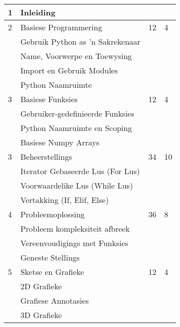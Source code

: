 \begin{longtable}{|p{2.0cm}|p{7.6cm}|p{2.0cm}|p{1.8cm}|}
             1  & Inleiding                                    &    &    \\
             \hline
             2  & Basiese Programmering                        & 12 & 4  \\
                & \qquad Gebruik Python as 'n Sakrekenaar      &    &    \\
                & \qquad Name, Voorwerpe en Toewysing          &    &    \\
                & \qquad Import en Gebruik Modules             &    &    \\
                & \qquad Python Naamruimte                     &    &    \\
             \hline
             3  & Basiese Funksies                             & 12 & 4  \\
                & \qquad Gebruiker-gedefinieerde Funksies      &    &    \\
                & \qquad Python Naamruimte en Scoping          &    &    \\
                & \qquad Basiese Numpy Arrays                  &    &    \\
             \hline
             3  & Beheerstellings                              & 34 & 10 \\
                & \qquad Iterator Gebaseerde Lus (For Lus)     &    &    \\
                & \qquad Voorwaardelike Lus (While Lus)        &    &    \\
                & \qquad Vertakking (If, Elif, Else)           &    &    \\
             \hline
             4  & Probleemoplossing                            & 36 & 8  \\
                & \qquad Probleem kompleksiteit afbreek        &    &    \\
                & \qquad Vereenvoudigings met Funksies         &    &    \\
                & \qquad Geneste Stellings                     &    &    \\
             \hline
             5  & Sketse en Grafieke                           & 12 & 4  \\
                & \qquad 2D Grafieke                           &    &    \\
                & \qquad Grafiese Annotasies                   &    &    \\
                & \qquad 3D Grafieke                           &    &    \\

\end{longtable}

